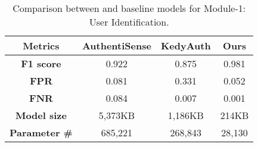 
\begin{comment}
    As shown in Figure \ref{fig:f1score} and \ref{fig:auc}, both F1 score and AUC are highest (F1 score: 0.93 and AUC: 0.96)
     when we use the model with sampling rate of 1 and 
    one second window, namely a single timestamp data analysis. Noticeably, for models running at frequencies of {1, 2} Hz, and with window size of {1, 2} seconds,
    we can get the satisfactory F1 scores and AUCs. This suggests that our model is capable of authenticating user
    in using low sampling rate and short window, which is helpful in reducing the computation time and workload.
     Generally, as the frequency and window size get larger, there is a drop
    in both F1 score and AUC. This may be due to the underfitting of the model since we adopt a relatively computationally-
    friendly model and only trained for \Le~epochs for quick training, so when the complexity of the input data increases, it would
    be more difficult for the model to learn the legitimate user's behavior pattern.
\end{comment}


    

        \begin{table}[htbp!]
            \centering\caption{Comparison between \sys and baseline models for Module-1: User Identification.}
            \label{tab:baseline}
                \begin{tabular}{cccc}
                \toprule
                \textbf{Metrics}      & \textbf{AuthentiSense} & \textbf{KedyAuth} & \textbf{Ours} \\
                \midrule
                \textbf{F1 score}     & 0.922         & 0.875     & 0.981   \\
                \textbf{FPR}          & 0.081         & 0.331     & 0.052         \\
                \textbf{FNR}          & 0.084         & 0.007     & 0.001         \\
                \textbf{Model size}   & 5,373KB                & 1,186KB           & 214KB         \\
                \textbf{Parameter \#} & 685,221                & 268,843           & 28,130       \\
                \bottomrule
                \end{tabular}
                \end{table}


